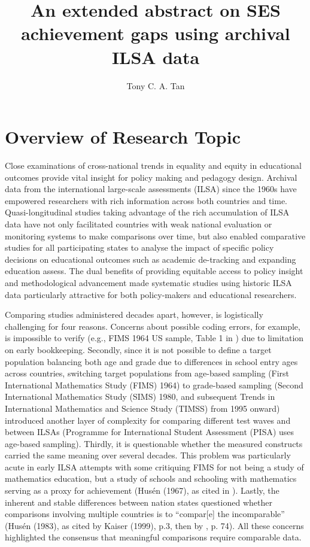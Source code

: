 \documentclass[
    a4paper,            %
    12pt,               %
    stu,                %
    donotrepeattitle,   %
    noextraspace,       %
    floatsintext,       %
    biblatex,           %
    colorlinks=true,        %
    linkcolor=red,          %
    anchorcolor=black,      %
    citecolor=blue,         %
    urlcolor=blue,          %
    bookmarks=true,         %
    bookmarksopen=false,    %
    bookmarksnumbered=true  %
]{apa7}
\title{An extended abstract on SES achievement gaps using archival ILSA data}
\author{Tony C. A. Tan}
\affiliation{Centre for Educational Measurement, University of Oslo}
\begin{document}
\maketitle
\setcounter{page}{1}
\section{Overview of Research Topic}

Close examinations of cross-national trends in equality and equity in educational outcomes provide vital insight for policy making and pedagogy design. Archival data from the international large-scale assessments (ILSA) since the 1960s have empowered researchers with rich information across both countries and time. Quasi-longitudinal studies taking advantage of the rich accumulation of ILSA data \parencite{chmielewski:2019, majoros:2021} have not only facilitated countries with weak national evaluation or monitoring systems to make comparisons over time, but also enabled comparative studies for all participating states \parencite{salmelaaro:2019,strietholt:2016} to analyse the impact of specific policy decisions on educational outcomes such as academic de-tracking and expanding education assess. The dual benefits of providing equitable access to policy insight and methodological advancement made systematic studies using historic ILSA data particularly attractive for both policy-makers and educational researchers.

Comparing studies administered decades apart, however, is logistically challenging for four reasons. Concerns about possible coding errors, for example, is impossible to verify (e.g., FIMS 1964 US sample, Table 1 in \textcite{majoros:2021}) due to limitation on early bookkeeping. Secondly, since it is not possible to define a target population balancing both age and grade due to differences in school entry ages across countries, switching target populations from age-based sampling (First International Mathematics Study (FIMS) 1964) to grade-based sampling (Second International Mathematics Study (SIMS) 1980, and subsequent Trends in International Mathematics and Science Study (TIMSS) from 1995 onward) introduced another layer of complexity for comparing different test waves and between ILSAs (Programme for International Student Assessment (PISA) uses age-based sampling). Thirdly, it is questionable whether the measured constructs carried the same meaning over several decades. This problem was particularly acute in early ILSA attempts with some critiquing FIMS for not being a study of mathematics education, but a study of schools and schooling with mathematics serving as a proxy for achievement (Hus{\'e}n (1967), as cited in \textcite{majoros:2021}). Lastly, the inherent and stable differences between nation states questioned whether comparisons involving multiple countries is to ``compar[e] the incomparable'' (Hus{\'e}n (1983), as cited by Kaiser (1999), p.3, then by \textcite{majoros:2021}, p. 74). All these concerns highlighted the consensus that meaningful comparisons require comparable data.
\end{document}
